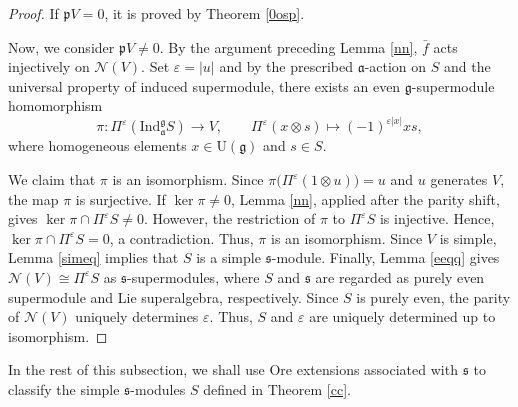 \documentclass[a4paper,10pt]{article}
\theoremstyle{definition}
\theoremstyle{plain}
\theoremstyle{remark}
\theoremstyle{mystyle}
\numberwithin{equation}{section}
\begin{document}
\begin{proof}
    If $\mathfrak pV=0$, it is proved by Theorem \ref{0osp}.

    Now, we consider $\mathfrak pV\neq 0$. By the argument preceding Lemma \ref{nn}, \(\bar f\) acts injectively on \(\mathcal N(V)\). Set $\varepsilon=|u|$ and by the prescribed $\mathfrak a$-action on $S$ and the universal property of induced supermodule, there exists an even $\mathfrak g$-supermodule homomorphism
    $$
    \pi:\Pi^{\varepsilon}(\mathrm{Ind}_{\mathfrak a}^{\mathfrak g}S)\to V,\qquad \Pi^{\varepsilon}(x\otimes s)\mapsto (-1)^{\varepsilon |x|}xs,
    $$
    where homogeneous elements \(x\in \mathrm U(\mathfrak g)\) and \(s\in S\).

    We claim that \(\pi\) is an isomorphism.
    Since $\pi\bigl(\Pi^\varepsilon(1\otimes u)\bigr)=u$ and $u$ generates $V$, the map \(\pi\) is surjective.
    If \(\ker\pi\neq0\), Lemma \ref{nn}, applied after the parity shift, gives $\ker\pi\cap\Pi^\varepsilon S\neq0$. However, the restriction of \(\pi\) to \(\Pi^\varepsilon S\) is injective. Hence, $\ker\pi\cap\Pi^\varepsilon S=0$, a contradiction.
    Thus, $\pi$ is an isomorphism. 
    Since \(V\) is simple, Lemma \ref{simeq} implies that \(S\) is a simple \(\mathfrak s\)-module. Finally, Lemma \ref{eeqq} gives $\mathcal N(V)\cong\Pi^\varepsilon S$ as $\mathfrak s$-supermodules, where $S$ and $\mathfrak s$ are regarded as purely even supermodule and Lie superalgebra, respectively. Since $S$ is purely even, the parity of $\mathcal N(V)$ uniquely determines $\varepsilon$. Thus, $S$ and $\varepsilon$ are uniquely determined up to isomorphism.
\end{proof}
In the rest of this subsection, we shall use Ore extensions associated with $\mathfrak s$ to classify the simple $\mathfrak s$-modules $S$ defined in Theorem \ref{cc}. 
\end{document}
